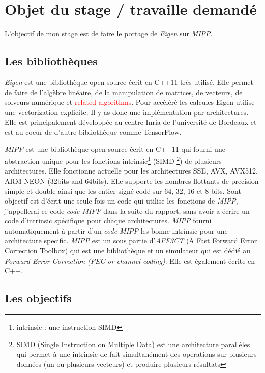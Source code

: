 \section{Objet du stage / travaille demandé}

L'objectif de mon stage est de faire le portage de \emph{Eigen} sur \emph{MIPP}.

\subsection{Les bibliothèques}

\emph{Eigen} est une bibliothèque open source écrit en C++11 très utilisé. Elle permet
de faire de l'algèbre linéaire, de la manipulation de matrices, de vecteurs,
de solveurs numérique et \textcolor{red}{related algorithms}. Pour accéléré les calcules
Eigen utilise une vectorization explicite. Il y as donc une implémentation par
architectures. Elle est principalement développée au centre Inria de l'université de
Bordeaux et est au coeur de d'autre bibliothèque comme TensorFlow.


\emph{MIPP} est une bibliothèque open source écrit en C++11 qui fourni une abstraction
unique pour les fonctions intrinsic\footnote{intrinsic : une instruction SIMD} (SIMD
\footnote{SIMD (Single Instruction on Multiple Data) est une architecture parallèles
qui permet à une intrinsic de fait simultanément des operations sur plusieurs données
(un ou plusieurs vecteurs) et produire plusieurs résultats}) de plusieurs architectures.
Elle fonctionne actuelle pour les architectures SSE, AVX, AVX512, ARM NEON (32bits and
64bits). Elle supporte les nombres flottants de precision simple et double ainsi que les
entier signé codé sur 64, 32, 16 et 8 bits. Sont objectif est d'écrit une seule fois un
code qui utilise les fonctions de \emph{MIPP}, j'appellerai ce code \emph{code MIPP} dans
la suite du rapport, sans avoir a écrire un code d'intrinsic spécifique pour chaque
architectures. \emph{MIPP} fourni automatiquement à partir d'un \emph{code MIPP} les
bonne intrinsic pour une architecture specific. \emph{MIPP} est un sous partie
d'\emph{AFF3CT} (A Fast Forward Error Correction Toolbox) qui est une bibliothèque et un
simulateur qui est dédié au \emph{Forward Error Correction (FEC or channel coding)}. Elle
est également écrite en C++.

\subsection{Les objectifs}

